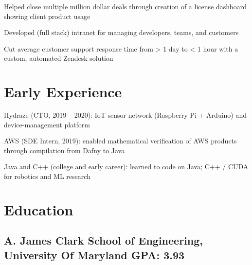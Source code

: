 \documentclass[print]{jack-resume}
\begin{document}
\begin{tightemize}
    \item Helped close multiple million dollar deals through creation of a license dashboard showing client product usage
    \item Developed (full stack) intranet for managing developers, teams, and customers
    \item Cut average customer support response time from > 1 day to < 1 hour with a custom, automated Zendesk solution
\end{tightemize}
\sectionsep

\section{Early Experience}
\vspace{1.4em}
\begin{tightemize}
    \item Hydraze (CTO, 2019 -- 2020): IoT sensor network (Raspberry Pi + Arduino) and device-management platform
    \item AWS (SDE Intern, 2019): enabled mathematical verification of AWS products through compilation from Dafny to Java
    \item Java and C++ (college and early career): learned to code on Java; C++ / CUDA for robotics and ML research
\end{tightemize}
\sectionsep

\section{Education}
\subsection{A. James Clark School of Engineering, University Of Maryland \hfill GPA: 3.93}

\begin{minipage}[t]{0.04\textwidth}
    \hfill
\end{minipage}
\end{document}
